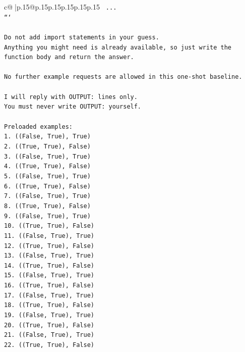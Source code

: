 \documentclass{article}
\begin{document}
{\begin{supertabular}{c@{$\;$}|p{.15\linewidth}@{}p{.15\linewidth}p{.15\linewidth}p{.15\linewidth}p{.15\linewidth}p{.15\linewidth}}
{{{\texttt{    ...} \\
\texttt{```} \\
\\ 
\texttt{Do not add import statements in your guess.} \\
\texttt{Anything you might need is already available, so just write the function body and return the answer.} \\
\\ 
\texttt{No further example requests are allowed in this one{-}shot baseline.} \\
\\ 
\texttt{I will reply with OUTPUT: lines only.} \\
\texttt{You must never write OUTPUT: yourself.} \\
\\ 
\texttt{Preloaded examples:} \\
\texttt{1. ((False, True), True)} \\
\texttt{2. ((True, True), False)} \\
\texttt{3. ((False, True), True)} \\
\texttt{4. ((True, True), False)} \\
\texttt{5. ((False, True), True)} \\
\texttt{6. ((True, True), False)} \\
\texttt{7. ((False, True), True)} \\
\texttt{8. ((True, True), False)} \\
\texttt{9. ((False, True), True)} \\
\texttt{10. ((True, True), False)} \\
\texttt{11. ((False, True), True)} \\
\texttt{12. ((True, True), False)} \\
\texttt{13. ((False, True), True)} \\
\texttt{14. ((True, True), False)} \\
\texttt{15. ((False, True), True)} \\
\texttt{16. ((True, True), False)} \\
\texttt{17. ((False, True), True)} \\
\texttt{18. ((True, True), False)} \\
\texttt{19. ((False, True), True)} \\
\texttt{20. ((True, True), False)} \\
\texttt{21. ((False, True), True)} \\
\texttt{22. ((True, True), False)} \\
}}}
\end{supertabular}}
\end{document}
